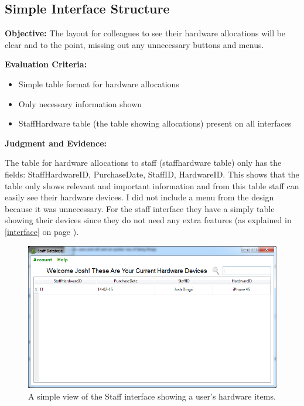 \subsection{Simple Interface Structure}

\textbf{Objective:} The layout for colleagues to see their hardware allocations will be clear and to the point, missing out any unnecessary buttons and menus.

\textbf{Evaluation Criteria:}
\begin{itemize}
\item{Simple table format for hardware allocations}
\item{Only necessary information shown}
\item{StaffHardware table (the table showing allocations) present on all interfaces}
\end{itemize}

\textbf{Judgment and Evidence:}

The table for hardware allocations to staff (staffhardware table) only has the fields: StaffHardwareID, PurchaseDate, StaffID, HardwareID. This shows that the table only shows relevant and important information and from this table staff can easily see their hardware devices. I did not include a menu from the design because it was unnecessary. For the staff interface they have a simply table showing their devices  since they do not need any extra features (as explained in \ref{interface} on page \pageref{interface}).

\begin{figure}[H]
    \includegraphics[width=\textwidth]{./Evaluation/Images/staffhardwaredevice.png}
    \caption{A simple view of the Staff interface showing a user's hardware items.} 
\end{figure}

